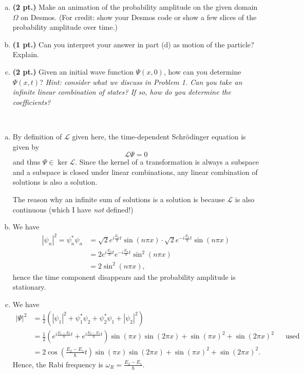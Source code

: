 \documentclass[12pt]{article} %
\begin{document}
\begin{problem}
\begin{enumerate}[(a)]
	\item \textbf{(2 pt.)} Make an animation of the probability amplitude on the given domain $\Omega$ on Desmos. (For credit: show your Desmos code or show a few slices of the probability amplitude over time.)
	\item \textbf{(1 pt.)} Can you interpret your answer in part (d) as motion of the particle? Explain.
	\item \textbf{(2 pt.)} Given an initial wave function $\Psi(x,0)$, how can you determine $\Psi(x,t)$? \emph{Hint: consider what we discuss in Problem 1. Can you take an infinite linear combination of states? If so, how do you determine the coefficients?}
\end{enumerate}
\end{problem}
\begin{solution}~
\begin{enumerate}[(a)]
\item By definition of $\mathcal{L}$ given here, the time-dependent Schr\"odinger equation is given by
\[
\mathcal{L} \Psi = 0
\]
and thus $\Psi \in \ker \mathcal{L}$. Since the kernel of a transformation is always a subspace and a subspace is closed under linear combinations, any linear combination of solutions is also a solution.

\begin{remark}
The reason why an infinite sum of solutions is a solution is because $\mathcal{L}$ is also continuous (which I have \emph{not} defined!)
\end{remark}

\item We have
\begin{align*}
|\psi_n|^2 = \psi_n^* \psi_n  &= \sqrt{2} e^{i \frac{E_n}{\hbar} t} \sin(n \pi x) \cdot \sqrt{2} e^{-i \frac{E_n}{\hbar} t} \sin(n \pi x)\\
&=2 e^{i \frac{E_n}{\hbar} t}e^{-i \frac{E_n}{\hbar} t} \sin^2(n\pi x)\\
&= 2 \sin^2(n \pi x),
\end{align*}
hence the time component disappears and the probability amplitude is stationary.

\item We have
\begin{align*}
	|\Psi|^2 &= \frac{1}{2} \left( |\psi_1|^2 + \psi_1^* \psi_2 + \psi_2^* \psi_1 + |\psi_2|^2 \right)\\
&= \frac{1}{2} \left(e^{i\frac{E_1-E_2}{\hbar}t} + e^{i\frac{E_2-E_1}{\hbar}t}\right) \sin(\pi x)\sin(2 \pi x)+ \sin(\pi x)^2 +\sin(2\pi x)^2 && \textrm{used result from (b)}\\
&= 2 \cos\left( \frac{E_2-E_1}{\hbar} t\right)\sin(\pi x)\sin(2\pi x)+ \sin(\pi x)^2 +\sin(2\pi x)^2.
\end{align*}
Hence, the Rabi frequency is $\omega_R= \frac{E_2-E_1}{\hbar}$.


\end{enumerate}
\end{solution}
\end{document}
